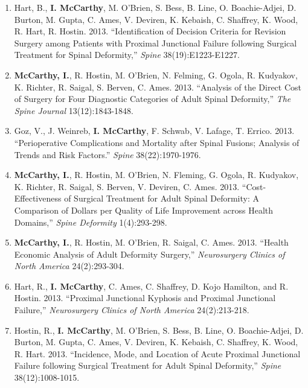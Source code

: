 \documentclass[9pt]{article}
\newenvironment{changemargin}[2]{%
  \begin{list}{}{%
    \setlength{\topsep}{0pt}%
    \setlength{\leftmargin}{#1}%
    \setlength{\rightmargin}{#2}%
    \setlength{\listparindent}{\parindent}%
    \setlength{\itemindent}{\parindent}%
    \setlength{\parsep}{\parskip}%
  }%
  \item[]}{\end{list}
}
\newenvironment{body} {
	\vspace*{-16pt}
	\begin{changemargin}{-0.25in}{-0.5in}
  }	
	{\end{changemargin}
}
\begin{document}
\begin{body}
\begin{enumerate}
    \item Hart, B., \textbf{I. McCarthy}, M. O'Brien, S. Bess, B. Line, O. Boachie-Adjei, D. Burton, M. Gupta, C. Ames, V. Deviren, K. Kebaish, C. Shaffrey, K. Wood, R. Hart, R. Hostin. 2013. ``Identification of Decision Criteria for Revision Surgery among Patients with Proximal Junctional Failure following Surgical Treatment for Spinal Deformity,'' \textit{Spine} 38(19):E1223-E1227.
    \item \textbf{McCarthy, I.}, R. Hostin, M. O'Brien, N. Felming, G. Ogola, R. Kudyakov, K. Richter, R. Saigal, S. Berven, C. Ames. 2013. ``Analysis of the Direct Cost of Surgery for Four Diagnostic Categories of Adult Spinal Deformity,'' \textit{The Spine Journal} 13(12):1843-1848.
    \item Goz, V., J. Weinreb, \textbf{I. McCarthy}, F. Schwab, V. Lafage, T. Errico. 2013. ``Perioperative Complications and Mortality after Spinal Fusions; Analysis of Trends and Risk Factors.'' \textit{Spine} 38(22):1970-1976.
    \item \textbf{McCarthy, I.}, R. Hostin, M. O'Brien, N. Fleming, G. Ogola, R. Kudyakov, K. Richter, R. Saigal, S. Berven, V. Deviren, C. Ames. 2013. ``Cost-Effectiveness of Surgical Treatment for Adult Spinal Deformity: A Comparison of Dollars per Quality of Life Improvement across Health Domains,'' \textit{Spine Deformity} 1(4):293-298.
    \item \textbf{McCarthy, I.}, R. Hostin, M. O'Brien, R. Saigal, C. Ames. 2013. ``Health Economic Analysis of Adult Deformity Surgery,'' \textit{Neurosurgery Clinics of North America} 24(2):293-304.
    \item Hart, R., \textbf{I. McCarthy}, C. Ames, C. Shaffrey, D. Kojo Hamilton, and R. Hostin. 2013. ``Proximal Junctional Kyphosis and Proximal Junctional Failure,'' \textit{Neurosurgery Clinics of North America} 24(2):213-218.
    \item Hostin, R., \textbf{I. McCarthy}, M. O'Brien, S. Bess, B. Line, O. Boachie-Adjei, D. Burton, M. Gupta, C. Ames, V. Deviren, K. Kebaish, C. Shaffrey, K. Wood, R. Hart. 2013. ``Incidence, Mode, and Location of Acute Proximal Junctional Failure following Surgical Treatment for Adult Spinal Deformity,'' \textit{Spine} 38(12):1008-1015.
  \end{enumerate}
\end{body}
\smallskip
\end{document}

